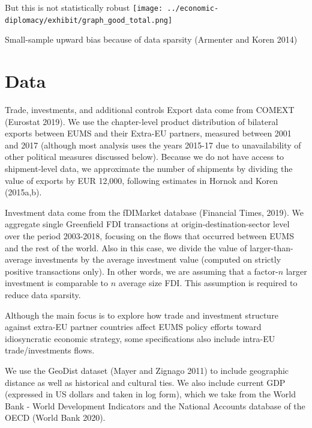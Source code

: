 \documentclass[
  ignorenonframetext,
  aspectratio=16,
]{beamer}
\begin{document}
\begin{frame}{But this is not statistically robust}
\protect\hypertarget{but-this-is-not-statistically-robust}{}
\texttt{[image: ../economic-diplomacy/exhibit/graph\_good\_total.png]}

Small-sample upward bias because of data sparsity (Armenter and Koren
2014)
\end{frame}

\hypertarget{data}{%
\section{Data}\label{data}}

\begin{frame}{Trade, investments, and additional controls}
\protect\hypertarget{trade-investments-and-additional-controls}{}
Export data come from COMEXT (Eurostat 2019). We use the chapter-level
product distribution of bilateral exports between EUMS and their
Extra-EU partners, measured between 2001 and 2017 (although most
analysis uses the years 2015-17 due to unavailability of other political
measures discussed below). Because we do not have access to
shipment-level data, we approximate the number of shipments by dividing
the value of exports by EUR 12,000, following estimates in Hornok and
Koren (2015a,b).

Investment data come from the fDIMarket database (Financial Times,
2019). We aggregate single Greenfield FDI transactions at
origin-destination-sector level over the period 2003-2018, focusing on
the flows that occurred between EUMS and the rest of the world. Also in
this case, we divide the value of larger-than-average investments by the
average investment value (computed on strictly positive transactions
only). In other words, we are assuming that a factor-\(n\) larger
investment is comparable to \(n\) average size FDI. This assumption is
required to reduce data sparsity.

Although the main focus is to explore how trade and investment structure
against extra-EU partner countries affect EUMS policy efforts toward
idiosyncratic economic strategy, some specifications also include
intra-EU trade/investments flows.

We use the GeoDist dataset (Mayer and Zignago 2011) to include
geographic distance as well as historical and cultural ties. We also
include current GDP (expressed in US dollars and taken in log form),
which we take from the World Bank - World Development Indicators and the
National Accounts database of the OECD (World Bank 2020).
\end{frame}
\end{document}
